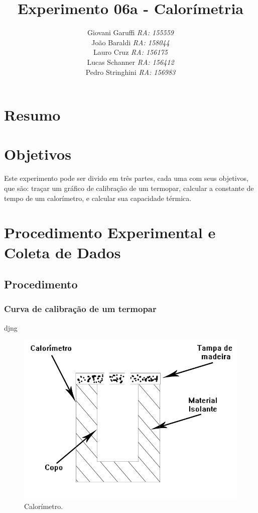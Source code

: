 \documentclass[12pt,a4paper]{article}
\begin{document}
\title{\vspace{70mm}\Huge Experimento 06a - Calorímetria}
\author{ Giovani Garuffi\qquad\hfill
		\textit {RA: 155559}\protect\\
		João Baraldi\hfill
		\textit{RA: 158044}\protect\\
		Lauro Cruz\hfill
		\textit{RA: 156175}\protect\\
		Lucas Schanner\hfill
		\textit{RA: 156412}\protect\\
		Pedro Stringhini\hfill
		\textit {RA: 156983}								
		}
\maketitle
\newpage
\section{Resumo}


\section{Objetivos}
Este experimento pode ser divido em três partes, cada uma com seus objetivos, que são: traçar um gráfico de calibração de um termopar, calcular a constante de tempo de um calorímetro, e calcular sua capacidade térmica.


\section{Procedimento Experimental e Coleta de Dados}


\subsection{Procedimento}


\subsubsection{Curva de calibração de um termopar}
djng
\begin{figure}
\centering
\includegraphics[scale=0.3]{Fig6a1.jpg}
\caption{Calorímetro.}
\label{calorimetro}
\end{figure}
\end{document}
